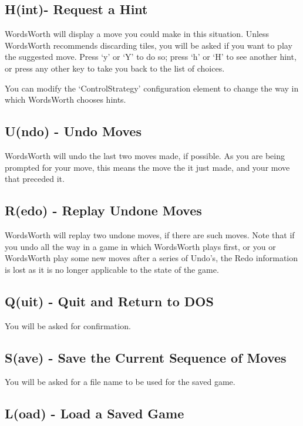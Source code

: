 \subsection{H(int)- Request a Hint}

WordsWorth will display a move you could make in this situation.
Unless WordsWorth recommends discarding tiles, you will be asked
if you want to play the suggested move. Press `y' or `Y' to do so;
press `h' or `H' to see another hint, or press any other key to take
you back to the list of choices.

You can modify the `ControlStrategy' configuration element to change
the way in which WordsWorth chooses hints.


\subsection{U(ndo) - Undo Moves}

WordsWorth will undo the last two moves made, if possible. As you
are being prompted for your move, this means the move the it just
made, and your move that preceded it.

\subsection{R(edo) - Replay Undone Moves}

WordsWorth will replay two undone moves, if there are such moves.
Note that if you undo all the way in a game in which WordsWorth plays
first, or you or WordsWorth play some new moves after a series of Undo's,
the Redo information is lost as it is no longer applicable to the state
of the game.

\subsection{Q(uit) - Quit and Return to DOS}

You will be asked for confirmation.

\subsection{S(ave) - Save the Current Sequence of Moves}

You will be asked for a file name to be used for the saved game. 

\subsection{L(oad) - Load a Saved Game}


